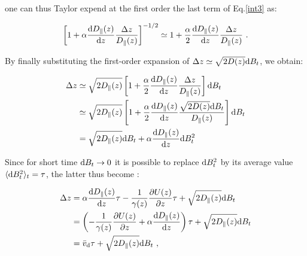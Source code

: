 one can thus Taylor expend at the first order the last term of Eq.\ref{int3} as:

\begin{equation}
	\left[1 + \alpha \frac{\textnormal{d} D_\parallel(z)}{\textnormal{d}z} \frac{\Delta z }{D_\parallel(z)}\right] ^{-1/2} \simeq 1 + \frac{\alpha }{2}\frac{\textnormal{d} D_\parallel(z)}{\textnormal{d}z} \frac{\Delta z }{D_\parallel(z)} ~.
\end{equation}

By finally substituting the first-order expansion of $\Delta z \simeq \sqrt{2D(z)} \textnormal{d}B_t$, we obtain:

\begin{equation}
	\begin{aligned}
		\Delta z & \simeq \sqrt{2D_\parallel (z)} \left[1 + \frac{\alpha }{2} \frac{\textnormal{d} D_\parallel(z)}{\textnormal{d}z} \frac{\Delta z }{D_\parallel(z)}\right]  \textnormal{d} B_t \\
		& \simeq \sqrt{2D_\parallel (z)} \left[1 + \frac{\alpha }{2} \frac{\textnormal{d} D_\parallel(z)}{\textnormal{d}z} \frac{\sqrt{2D(z)} \textnormal{d}B_t }{D_\parallel(z)}\right]  \textnormal{d} B_t \\
		& =  \sqrt{2D_\parallel (z)} \textnormal{d}B_t + \alpha  \frac{\textnormal{d} D_\parallel(z)}{\textnormal{d}z} \textnormal{d} B_t ^2
	\end{aligned}
\end{equation}



Since for short time $\textnormal{d}B_t \rightarrow 0$ it is possible to replace $\textnormal{d}B_t ^2$ by its average value  $\langle \textnormal{d}B_t ^2 \rangle _t = \tau$, the latter thus become \cite{ikeda_stochastic_2014}: 

\begin{equation}
	\begin{aligned}
	\Delta z &=   \alpha  \frac{\textnormal{d} D_\parallel(z)}{\textnormal{d}z}  \tau - \frac{1}{\gamma(z)}\frac{\partial U(z)}{\partial z}  \tau + \sqrt{2D_\parallel (z)} \textnormal{d}B_t \\
	&=  \left( - \frac{1}{\gamma(z)}\frac{\partial U(z)}{\partial z} +  \alpha  \frac{\textnormal{d} D_\parallel(z)}{\textnormal{d}z} \right) \tau + \sqrt{2D_\parallel (z)} \textnormal{d}B_t \\
	&= \bar{v}_\textnormal{d}\tau  + \sqrt{2D_\parallel (z)} \textnormal{d}B_t ~,
	\end{aligned}
\end{equation}

